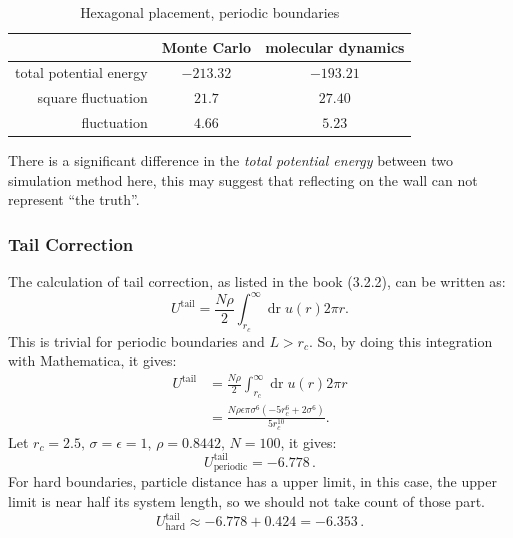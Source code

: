 \documentclass[UTF8,a4paper]{article}
\begin{document}
\begin{table}[H]
	\centering
	\caption{Hexagonal placement, periodic boundaries}
	\begin{tabular}{rcc}
		\toprule
		\toprule
		                       & Monte Carlo & molecular dynamics \\ \midrule
		total potential energy & $-213.32$   & $-193.21$          \\
		square fluctuation     & $21.7$      & $27.40$            \\
		fluctuation            & $4.66$      & $5.23$             \\
		\bottomrule
	\end{tabular}%
	\label{tab:hex2}%
\end{table}%
There is a significant difference in the \textit{total potential energy} between two simulation method here, this may suggest that reflecting on the wall can not represent ``the truth''.

\subsubsection{Tail Correction}
The calculation of tail correction, as listed in the book (3.2.2), can be written as:
\begin{equation}
	U^{\text{tail}} = \frac{N \rho}{2} \int_{r_{c}}^{\infty} \operatorname{dr} u(r) 2 \pi r.
\end{equation}
This is trivial for periodic boundaries and $L>r_c$. So, by doing this integration with Mathematica, it gives:
\begin{equation}
	\begin{aligned}
		U^{\text{tail}} & = \frac{N \rho}{2} \int_{r_{c}}^{\infty} \operatorname{dr} u(r) 2 \pi r              \\
		                & = \frac{N \rho \epsilon \pi \sigma^6\left(-5 r_c^6 + 2 \sigma^6\right)}{5 r_c^{10}}.
	\end{aligned}
	\label{eq:tail}
\end{equation}
Let $r_c = 2.5, \, \sigma = \epsilon = 1, \,\rho = 0.8442, \,N = 100$, it gives:
\begin{equation*}
	U^{\text{tail}}_{\text{periodic}} = -6.778\,.
\end{equation*}
For hard boundaries, particle distance has a upper limit, in this case, the upper limit is near half its system length, so we should not take count of those part.
\begin{equation*}
	U^{\text{tail}}_{\text{hard}} \approx -6.778 + 0.424 = -6.353 \,.
\end{equation*}
\end{document}
